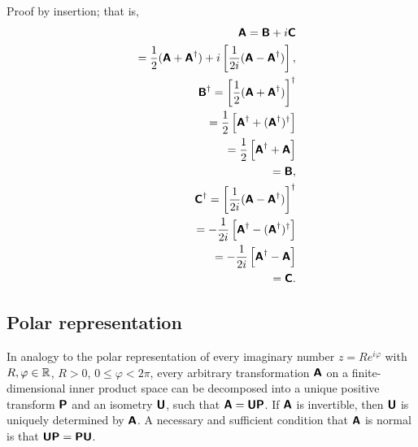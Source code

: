 {\color{OliveGreen}
\bproof
Proof by insertion; that is,
\begin{equation}
\begin{split}
\textsf{\textbf{A}}=\textsf{\textbf{B}} + i \textsf{\textbf{C}}\\
\quad =
\frac{1}{2}(\textsf{\textbf{A}} +   \textsf{\textbf{A}}^\dagger ) + i \left[\frac{1}{2i}(\textsf{\textbf{A}} -   \textsf{\textbf{A}}^\dagger )\right],
\\
\textsf{\textbf{B}}^\dagger=   \left[\frac{1}{2}(\textsf{\textbf{A}} +   \textsf{\textbf{A}}^\dagger )\right]^\dagger\\
\quad =    \frac{1}{2}\left[\textsf{\textbf{A}}^\dagger +  ( \textsf{\textbf{A}}^\dagger )^\dagger \right]\\
\quad =    \frac{1}{2}\left[\textsf{\textbf{A}}^\dagger +    \textsf{\textbf{A}} \right]\\
\quad =  \textsf{\textbf{B}} , \\
\textsf{\textbf{C}}^\dagger=   \left[\frac{1}{2i}(\textsf{\textbf{A}} -   \textsf{\textbf{A}}^\dagger )\right]^\dagger\\
\quad =   -\frac{1}{2i}\left[\textsf{\textbf{A}}^\dagger -  ( \textsf{\textbf{A}}^\dagger )^\dagger \right]\\
\quad =   -\frac{1}{2i}\left[\textsf{\textbf{A}}^\dagger -    \textsf{\textbf{A}}\right]\\
\quad =  \textsf{\textbf{C}} .
\end{split}
\end{equation}
\eproof
}


\subsection{Polar representation}

In analogy to the polar representation of every imaginary number $z= R e^{i\varphi}$ with $R,\varphi \in {\Bbb R}$, $R>0$,
$0\le \varphi < 2\pi$,
every arbitrary transformation $\textsf{\textbf{A}}$ on a finite-dimensional inner product space can be decomposed into
a unique positive transform
$\textsf{\textbf{P}}$ and an isometry
$\textsf{\textbf{U}}$, such that $\textsf{\textbf{A}}= \textsf{\textbf{U}} \textsf{\textbf{P}}$.
If $\textsf{\textbf{A}}$ is invertible, then $\textsf{\textbf{U}}$  is uniquely determined by
$\textsf{\textbf{A}}$.
A necessary and sufficient condition that $\textsf{\textbf{A}}$ is normal is that
$\textsf{\textbf{U}} \textsf{\textbf{P}}=\textsf{\textbf{P}} \textsf{\textbf{U}} $.

